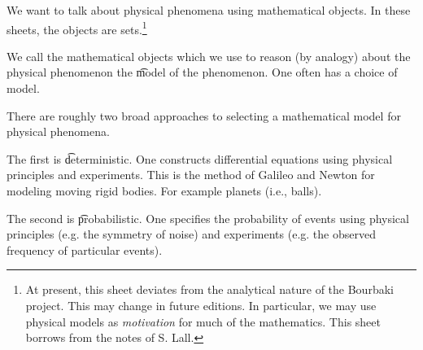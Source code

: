 

We want to talk about physical phenomena using mathematical objects.
In these sheets, the objects are sets.\footnote{At present, this sheet deviates from the analytical nature of the Bourbaki project. This may change in future editions. In particular, we may use physical models as \textit{motivation} for much of the mathematics. This sheet borrows from the notes of S. Lall.}


We call the mathematical objects which we use to reason (by analogy) about the physical phenomenon the \t{model} of the phenomenon.
One often has a choice of model.


There are roughly two broad approaches to selecting a mathematical model for physical phenomena.

The first is \t{deterministic}.
One constructs differential equations using physical principles and experiments.
This is the method of Galileo and Newton for modeling moving rigid bodies.
For example planets (i.e., balls).

The second is \t{probabilistic}.
One specifies the probability of events using physical principles (e.g. the symmetry of noise) and experiments (e.g. the observed frequency of particular events).

\blankpage
